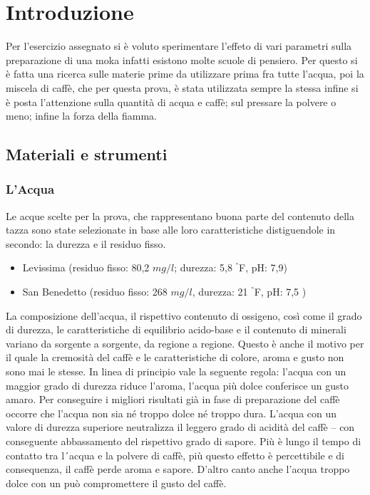 \chapter{Introduzione}
Per l'esercizio assegnato si è voluto sperimentare l'effeto di vari parametri sulla preparazione di una moka infatti esistono molte scuole di pensiero.
Per questo si è fatta una ricerca sulle materie prime da utilizzare prima fra tutte l'acqua, poi la miscela di caffè, che per questa prova, è stata utilizzata sempre la stessa infine si è posta l'attenzione sulla quantità di acqua e caffè; sul pressare la polvere o meno; infine la forza della fiamma.
\section{Materiali e strumenti}
\subsection{L'Acqua}
Le acque scelte per la prova, che rappresentano buona parte del contenuto della tazza sono state selezionate in base alle loro caratteristiche distiguendole in secondo: la durezza e il residuo fisso.
\begin{itemize}
  \item Levissima (residuo fisso: 80,2 $mg/l$; durezza: 5,8 $^{°}$F, pH: 7,9)
  \item San Benedetto (residuo fisso: 268 $mg/l$, durezza: 21 $^{°}$F, pH: 7,5 )
\end{itemize}
La composizione dell’acqua, il rispettivo contenuto di ossigeno, così come il grado di durezza, le caratteristiche di equilibrio acido-base e il contenuto di minerali variano da sorgente a sorgente, da regione a regione. Questo è anche il motivo per il quale la cremosità del caffè e le caratteristiche di colore, aroma e gusto non sono mai le stesse.
In linea di principio vale la seguente regola: l’acqua con un maggior grado di durezza riduce l’aroma, l’acqua più dolce conferisce un gusto amaro.
Per conseguire i migliori risultati già in fase di preparazione del caffè occorre che l’acqua non sia né troppo dolce né troppo dura. L’acqua con un valore di durezza superiore neutralizza il leggero grado di acidità del caffè – con conseguente abbassamento del rispettivo grado di sapore. Più è lungo il tempo di contatto tra l´acqua e la polvere di caffè, più questo effetto è percettibile e di consequenza, il caffè perde aroma e sapore. D’altro canto anche l’acqua troppo dolce con un può compromettere il gusto del caffè\cite{mo_2017}\cite{acqua}.


